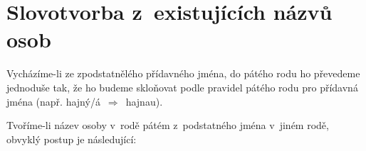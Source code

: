 %
%
%

\clearpage
\section{Slovotvorba z existujících názvů osob}

Vycházíme-li ze zpodstatnělého přídavného jména,
do pátého rodu ho převedeme jednoduše tak, že ho budeme skloňovat podle pravidel
pátého rodu pro přídavná jména (např. hajný/á~$\Rightarrow$~hajnau).

Tvoříme-li název osoby v rodě pátém z podstatného jména v jiném rodě,
obvyklý postup je následující:

